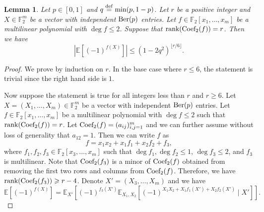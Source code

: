 \documentclass[reqno]{amsart}
\newtheorem{lemma}[theorem]{Lemma}
\theoremstyle{definition}
\numberwithin{theorem}{section}
\renewcommand{\leq}{\le}
\renewcommand{\geq}{\ge}
\newcommand{\E}{\mathbb{E}}
\newcommand{\FF}{\mathbb F}
\def\eqdef{\overset{\rm{def}}{=}}
\renewcommand{\le}{\leqslant}
\renewcommand{\ge}{\geqslant}
\newcommand{\EE}{\mathbb E}
\newcommand{\abs}[1]{\left|#1\right|}
\newcommand{\F}{\mathbb{F}}
\newcommand{\Ber}{\textup{Ber}}
\newcommand{\rank}{\textup{rank}}
\newcommand{\Coef}{\textup{Coef}}
\begin{document}
\begin{lemma}\label{lem:1}
    Let $p\in [0,1]$ and $q\eqdef\min(p,1-p)$. Let $r$ be a positive integer and $X\in \F_2^m$ be a vector with independent $\Ber(p)$ entries. Let $f\in\FF_2[x_1,\dots,x_m]$ be a multilinear polynomial with $\deg f\leq 2$. Suppose that $\rank(\Coef_2(f))=r$. Then we have
    \[\abs{\E[(-1)^{f(X)}]}\le (1-2q^2)^{\lfloor r/6\rfloor}.\]
\end{lemma}

\begin{proof}
    We prove by induction on $r$. In the base case where $r\leq 6$, the statement is trivial since the right hand side is $1$.

    Now suppose the statement is true for all integers less than $r$ and $r\geq 6$. Let $X=(X_1,\dots,X_m)\in \F_2^m$ be a vector with independent $\Ber(p)$ entries.
    Let $f\in\FF_2[x_1,\dots,x_m]$ be a multilinear polynomial with $\deg f\leq 2$ such that $\rank(\Coef_2(f))=r$. Let $\Coef_2(f)=(a_{ij})_{i,j=1}^m$ and we can further assume without loss of generality that $a_{12}=1$. Then we can write $f$ as
    \[f=x_1x_2+x_1f_1+x_2f_2+f_3,\]
    where $f_1,f_2,f_3\in \FF_2[x_3,\dots,x_m]$ such that $\deg f_1,\deg f_2\leq 1$, $\deg f_3\leq 2$, and $f_3$ is multilinear. Note that $\Coef_2(f_3)$ is a minor of $\Coef_2(f)$ obtained from removing the first two rows and columns from $\Coef_2(f)$. Therefore, we have $\rank(\Coef_2(f_3))\geq r-4$. Denote $X'=(X_3,\dots,X_m)$ and we have 
    \[\EE[(-1)^{f(X)}] = \EE_{X'}\left[(-1)^{f_3(X')}\EE_{X_1,X_2}[(-1)^{X_1X_2+X_1f_1(X')+X_2f_2(X')}\mid X']\right].\]


\end{proof}
\end{document}
